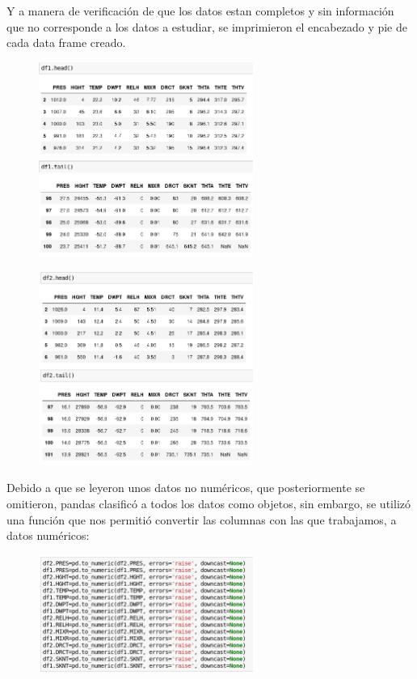 \documentclass[a4paper]{article}
\begin{document}
Y a manera de verificación de que los datos estan completos y sin información que no corresponde a los datos a estudiar, se imprimieron el encabezado y pie de cada data frame creado. 
\begin{figure}[h!]
  \includegraphics[width=7cm]{2.png}
  \centering
  \label{fig:2}
\end{figure}
\begin{figure}[h!]
  \includegraphics[width=7cm]{3.png}
  \centering
  \label{fig:3}
\end{figure}

Debido a que se leyeron unos datos no numéricos, que posteriormente se omitieron, pandas clasificó a todos los datos como objetos, sin embargo, se utilizó una función que nos permitió convertir las columnas con las que trabajamos, a datos numéricos: 

\begin{figure}[h!]
  \includegraphics[width=7cm]{4.png}
  \centering
  \label{fig:4}
\end{figure}
\end{document}
